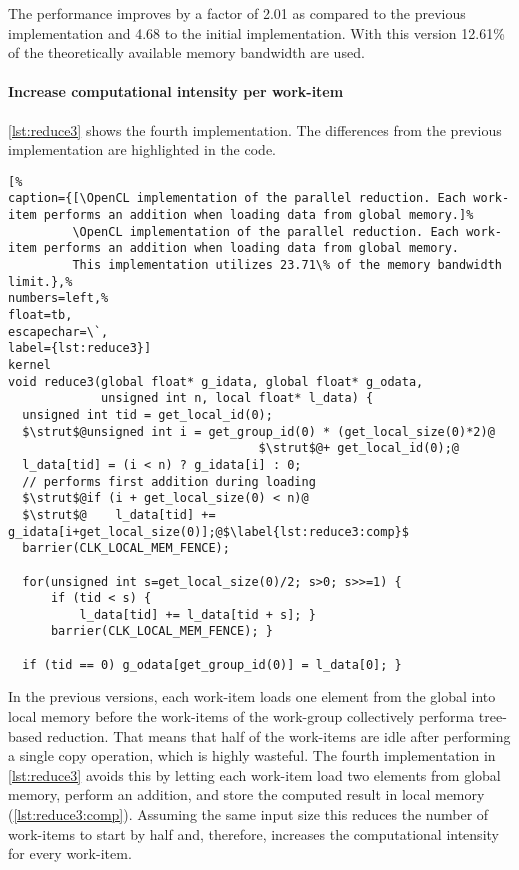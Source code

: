 The performance improves by a factor of 2.01 as compared to the previous implementation and 4.68 to the initial implementation.
With this version 12.61\% of the theoretically available memory bandwidth are used.



\FloatBarrier
\newpage

\paragraph{Increase computational intensity per work-item}

\autoref{lst:reduce3} shows the fourth implementation.
The differences from the previous implementation are highlighted in the code.
\begin{lstlisting}[%
caption={[\OpenCL implementation of the parallel reduction. Each work-item performs an addition when loading data from global memory.]%
         \OpenCL implementation of the parallel reduction. Each work-item performs an addition when loading data from global memory.
         This implementation utilizes 23.71\% of the memory bandwidth limit.},%
numbers=left,%
float=tb,
escapechar=\`,
label={lst:reduce3}]
kernel
void reduce3(global float* g_idata, global float* g_odata,
             unsigned int n, local float* l_data) {
  unsigned int tid = get_local_id(0);
  $\strut$@unsigned int i = get_group_id(0) * (get_local_size(0)*2)@
                                   $\strut$@+ get_local_id(0);@
  l_data[tid] = (i < n) ? g_idata[i] : 0;
  // performs first addition during loading
  $\strut$@if (i + get_local_size(0) < n)@
  $\strut$@    l_data[tid] += g_idata[i+get_local_size(0)];@$\label{lst:reduce3:comp}$
  barrier(CLK_LOCAL_MEM_FENCE);

  for(unsigned int s=get_local_size(0)/2; s>0; s>>=1) {
      if (tid < s) {
          l_data[tid] += l_data[tid + s]; }
      barrier(CLK_LOCAL_MEM_FENCE); }

  if (tid == 0) g_odata[get_group_id(0)] = l_data[0]; }
\end{lstlisting}

In the previous versions, each work-item loads one element from the global into local memory before the work-items of the work-group collectively performa tree-based reduction.
That means that half of the work-items are idle after performing a single copy operation, which is highly wasteful.
The fourth implementation in \autoref{lst:reduce3} avoids this by letting each work-item load two elements from global memory, perform an addition, and store the computed result in local memory (\autoref{lst:reduce3:comp}).
Assuming the same input size this reduces the number of work-items to start by half and, therefore, increases the computational intensity for every work-item.

